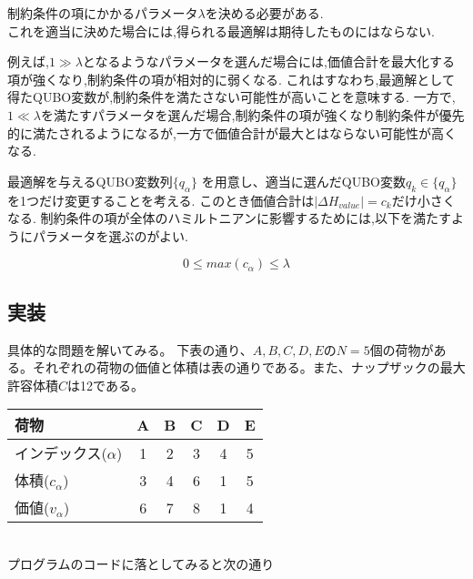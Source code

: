 \documentclass[uplatex,dvipdfmx,a4paper,11pt,oneside,openany]{jsbook}
\begin{document}
\begin{screen}
制約条件の項にかかるパラメータ$\lambda$を決める必要がある.\\
これを適当に決めた場合には,得られる最適解は期待したものにはならない.

例えば,$1\gg\lambda$となるようなパラメータを選んだ場合には,価値合計を最大化する項が強くなり,制約条件の項が相対的に弱くなる.
これはすなわち,最適解として得たQUBO変数が,制約条件を満たさない可能性が高いことを意味する.
一方で,$1\ll\lambda$を満たすパラメータを選んだ場合,制約条件の項が強くなり制約条件が優先的に満たされるようになるが,一方で価値合計が最大とはならない可能性が高くなる.

最適解を与えるQUBO変数列$\{q_\alpha\}$
を用意し、適当に選んだQUBO変数$q_k \in \{q_\alpha\}$を1つだけ変更することを考える.
このとき価値合計は$|\Delta H_{value}|=c_k$だけ小さくなる.
制約条件の項が全体のハミルトニアンに影響するためには,以下を満たすようにパラメータを選ぶのがよい.

\[
0 \le max(c_\alpha)\le\lambda
\]
\end{screen}

\subsection{実装}

具体的な問題を解いてみる。
下表の通り、$A,B,C,D,E$の$N=5$個の荷物がある。それぞれの荷物の価値と体積は表の通りである。また、ナップザックの最大許容体積$C$は12である。\\

\begin{tabular}{|l|ccccc|}\hline
  荷物 & A & B & C & D & E \\\hline
  インデックス($\alpha$) & 1 & 2 & 3 & 4 & 5 \\\hline
  体積($c_\alpha$) & 3 & 4 & 6 & 1 & 5 \\\hline
  価値($v_\alpha$) & 6 & 7 & 8 & 1 & 4 \\\hline
\end{tabular}\\

プログラムのコードに落としてみると次の通り
\end{document}
